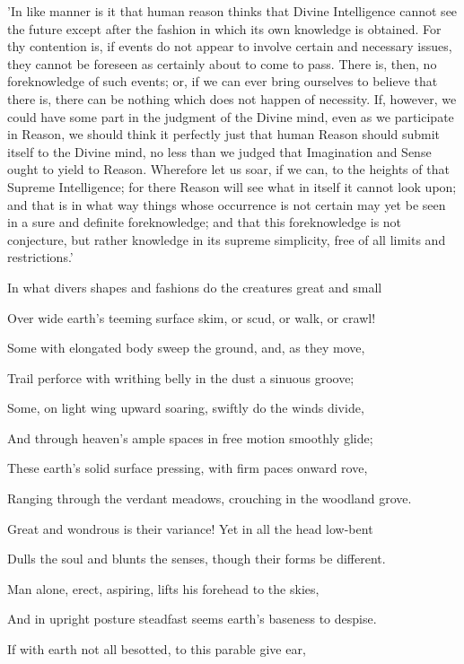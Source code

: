 'In like manner is it that human reason thinks that Divine Intelligence
cannot see the future except after the fashion in which its own
knowledge is obtained. For thy contention is, if events do not appear to
involve certain and necessary issues, they cannot be foreseen as
certainly about to come to pass. There is, then, no foreknowledge of
such events; or, if we can ever bring ourselves to believe that there
is, there can be nothing which does not happen of necessity. If,
however, we could have some part in the judgment of the Divine mind,
even as we participate in Reason, we should think it perfectly just that
human Reason should submit itself to the Divine mind, no less than we
judged that Imagination and Sense ought to yield to Reason. Wherefore
let us soar, if we can, to the heights of that Supreme Intelligence; for
there Reason will see what in itself it cannot look upon; and that is in
what way things whose occurrence is not certain may yet be seen in a
sure and definite foreknowledge; and that this foreknowledge is not
conjecture, but rather knowledge in its supreme simplicity, free of all
limits and restrictions.'


In what divers shapes and fashions do the creatures great and small

Over wide earth's teeming surface skim, or scud, or walk, or crawl!

Some with elongated body sweep the ground, and, as they move,

Trail perforce with writhing belly in the dust a sinuous groove;

Some, on light wing upward soaring, swiftly do the winds divide,

And through heaven's ample spaces in free motion smoothly glide;

These earth's solid surface pressing, with firm paces onward rove,

Ranging through the verdant meadows, crouching in the woodland grove.

Great and wondrous is their variance! Yet in all the head low-bent

Dulls the soul and blunts the senses, though their forms be different.

Man alone, erect, aspiring, lifts his forehead to the skies,

And in upright posture steadfast seems earth's baseness to despise.

If with earth not all besotted, to this parable give ear,

